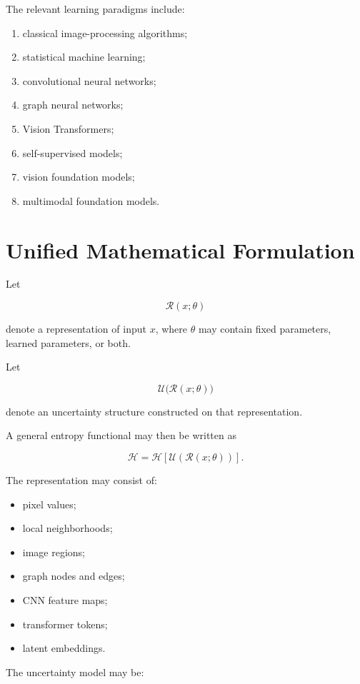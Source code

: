 \documentclass[11pt,oneside]{book}
\theoremstyle{remark}
\newcommand{\Entropy}{\mathcal{H}}
\begin{document}
	The relevant learning paradigms include:
	
	\begin{enumerate}
		\item classical image-processing algorithms;
		\item statistical machine learning;
		\item convolutional neural networks;
		\item graph neural networks;
		\item Vision Transformers;
		\item self-supervised models;
		\item vision foundation models;
		\item multimodal foundation models.
	\end{enumerate}
	
	\section{Unified Mathematical Formulation}
	
	Let
	
	\[
	\mathcal{R}(x;\theta)
	\]
	
	denote a representation of input \(x\), where \(\theta\) may contain fixed
	parameters, learned parameters, or both.
	
	Let
	
	\[
	\mathcal{U}
	\bigl(
	\mathcal{R}(x;\theta)
	\bigr)
	\]
	
	denote an uncertainty structure constructed on that representation.
	
	A general entropy functional may then be written as
	
	\[
	\boxed{
		\Entropy
		=
		\Entropy
		\left[
		\mathcal{U}
		\left(
		\mathcal{R}(x;\theta)
		\right)
		\right].
	}
	\]
	
	The representation may consist of:
	
	\begin{itemize}
		\item pixel values;
		\item local neighborhoods;
		\item image regions;
		\item graph nodes and edges;
		\item CNN feature maps;
		\item transformer tokens;
		\item latent embeddings.
	\end{itemize}
	
	The uncertainty model may be:
	
\end{document}
